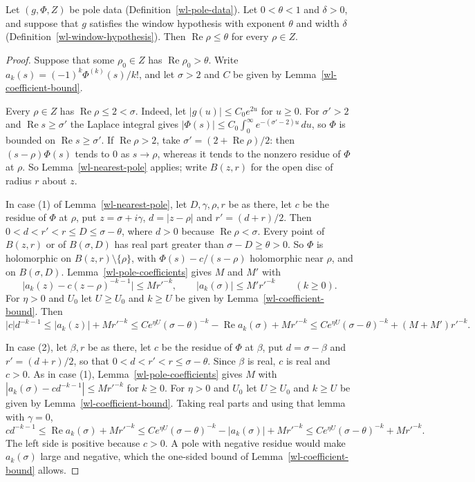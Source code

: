 \begin{theorem}\label{wl-landau-window}
Let $(g,\Phi,Z)$ be pole data (Definition~\ref{wl-pole-data}). Let
$0<\theta<1$ and $\delta>0$, and suppose that $g$ satisfies the window
hypothesis with exponent $\theta$ and width $\delta$
(Definition~\ref{wl-window-hypothesis}). Then $\operatorname{Re}\rho\leq\theta$
for every $\rho\in Z$.
\end{theorem}
\begin{proof}
Suppose that some $\rho_0\in Z$ has $\operatorname{Re}\rho_0>\theta$. Write
$a_k(s)=(-1)^k\Phi^{(k)}(s)/k!$, and let $\sigma>2$ and $C$ be given by
Lemma~\ref{wl-coefficient-bound}.

Every $\rho\in Z$ has $\operatorname{Re}\rho\leq2<\sigma$. Indeed, let
$|g(u)|\leq C_0e^{2u}$ for $u\geq0$. For $\sigma'>2$ and
$\operatorname{Re}s\geq\sigma'$ the Laplace integral gives
$|\Phi(s)|\leq C_0\int_0^\infty e^{-(\sigma'-2)u}\,du$, so $\Phi$ is bounded on
$\operatorname{Re}s\geq\sigma'$. If $\operatorname{Re}\rho>2$, take
$\sigma'=(2+\operatorname{Re}\rho)/2$: then $(s-\rho)\Phi(s)$ tends to $0$ as
$s\to\rho$, whereas it tends to the nonzero residue of $\Phi$ at $\rho$. So
Lemma~\ref{wl-nearest-pole} applies; write $B(z,r)$ for the open disc of
radius $r$ about $z$.

In case (1) of Lemma~\ref{wl-nearest-pole}, let $D,\gamma,\rho,r$ be as there,
let $c$ be the residue of $\Phi$ at $\rho$, put $z=\sigma+i\gamma$,
$d=|z-\rho|$ and $r'=(d+r)/2$. Then $0<d<r'<r\leq D\leq\sigma-\theta$, where
$d>0$ because $\operatorname{Re}\rho<\sigma$. Every point of $B(z,r)$ or of
$B(\sigma,D)$ has real part greater than $\sigma-D\geq\theta>0$. So $\Phi$ is
holomorphic on $B(z,r)\setminus\{\rho\}$, with $\Phi(s)-c/(s-\rho)$ holomorphic
near $\rho$, and on $B(\sigma,D)$. Lemma~\ref{wl-pole-coefficients} gives $M$
and $M'$ with
\[
 \bigl|a_k(z)-c(z-\rho)^{-k-1}\bigr|\leq Mr'^{-k},\qquad
 |a_k(\sigma)|\leq M'r'^{-k}\qquad(k\geq0).
\]
For $\eta>0$ and $U_0$ let $U\geq U_0$ and $k\geq U$ be given by
Lemma~\ref{wl-coefficient-bound}. Then
\[
 |c|d^{-k-1}\leq|a_k(z)|+Mr'^{-k}
 \leq Ce^{\eta U}(\sigma-\theta)^{-k}-\operatorname{Re}a_k(\sigma)+Mr'^{-k}
 \leq Ce^{\eta U}(\sigma-\theta)^{-k}+(M+M')r'^{-k}.
\]

In case (2), let $\beta,r$ be as there, let $c$ be the residue of $\Phi$ at
$\beta$, put $d=\sigma-\beta$ and $r'=(d+r)/2$, so that
$0<d<r'<r\leq\sigma-\theta$. Since $\beta$ is real, $c$ is real and $c>0$. As
in case (1), Lemma~\ref{wl-pole-coefficients} gives $M$ with
$|a_k(\sigma)-cd^{-k-1}|\leq Mr'^{-k}$ for $k\geq0$. For $\eta>0$ and $U_0$
let $U\geq U_0$ and $k\geq U$ be given by Lemma~\ref{wl-coefficient-bound}.
Taking real parts and using that lemma with $\gamma=0$,
\[
 cd^{-k-1}\leq\operatorname{Re}a_k(\sigma)+Mr'^{-k}
 \leq Ce^{\eta U}(\sigma-\theta)^{-k}-|a_k(\sigma)|+Mr'^{-k}
 \leq Ce^{\eta U}(\sigma-\theta)^{-k}+Mr'^{-k}.
\]
The left side is positive because $c>0$. A pole with negative residue would
make $a_k(\sigma)$ large and negative, which the one-sided bound of
Lemma~\ref{wl-coefficient-bound} allows.


\end{proof}

